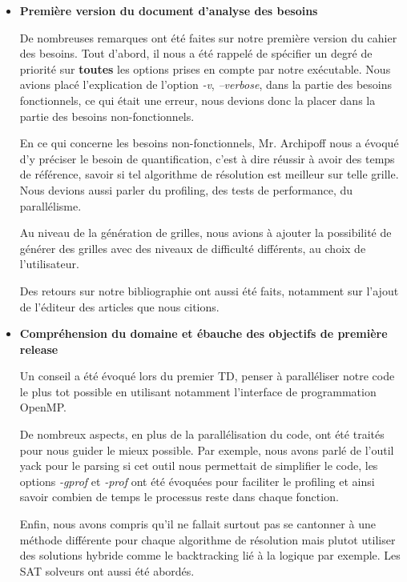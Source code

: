 \documentclass[1]{report}
\begin{document}
        \begin{itemize}

            \item \textbf{Première version du document d'analyse des besoins}

            De nombreuses remarques ont été faites sur notre première version du cahier des besoins. Tout d'abord, il nous a été rappelé de spécifier un degré de priorité sur \textbf{toutes} les options prises en compte par notre exécutable.
            Nous avions placé l'explication de l'option \emph{-v}, \emph{--verbose}, dans la partie des besoins fonctionnels, ce qui était une erreur, nous devions donc la placer dans la partie des besoins non-fonctionnels.

            En ce qui concerne les besoins non-fonctionnels, Mr. Archipoff nous a évoqué d'y préciser le besoin de quantification, c'est à dire réussir à avoir des temps de référence, savoir si tel algorithme de résolution est meilleur sur telle grille. Nous devions aussi parler du profiling, des tests de performance, du parallélisme.

            Au niveau de la génération de grilles, nous avions à ajouter la possibilité de générer des grilles avec des niveaux de difficulté différents, au choix de l'utilisateur.

            Des retours sur notre bibliographie ont aussi été faits, notamment sur l'ajout de l'éditeur des articles que nous citions.

        \end{itemize}

        \begin{itemize}

            \item \textbf{Compréhension du domaine et ébauche des objectifs de première release}

            Un conseil a été évoqué lors du premier TD, penser à paralléliser notre code le plus tot possible en utilisant notamment l'interface de programmation OpenMP.

            De nombreux aspects, en plus de la parallélisation du code, ont été traités pour nous guider le mieux possible. Par exemple, nous avons parlé de l'outil yack pour le parsing si cet outil nous permettait de simplifier le code, les options \emph{-gprof} et \emph{-prof} ont été évoquées pour faciliter le profiling et ainsi savoir combien de temps le processus reste dans chaque fonction.

            Enfin, nous avons compris qu'il ne fallait surtout pas se cantonner à une méthode différente pour chaque algorithme de résolution mais plutot utiliser des solutions hybride comme le backtracking lié à la logique par exemple. Les SAT solveurs ont aussi été abordés.

        \end{itemize}
\end{document}
